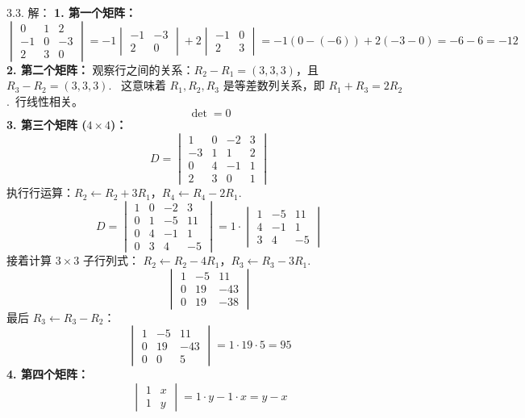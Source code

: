 \begin{exer}
3.3. 解：
\textbf{1. 第一个矩阵：}
$$ \begin{vmatrix} 0 & 1 & 2 \\ -1 & 0 & -3 \\ 2 & 3 & 0 \end{vmatrix} = -1 \begin{vmatrix} -1 & -3 \\ 2 & 0 \end{vmatrix} + 2 \begin{vmatrix} -1 & 0 \\ 2 & 3 \end{vmatrix} = -1(0 - (-6)) + 2(-3 - 0) = -6 - 6 = -12 $$
\textbf{2. 第二个矩阵：}
观察行之间的关系：$R_2 - R_1 = (3, 3, 3)$，且 $R_3 - R_2 = (3, 3, 3)$.~
这意味着 $R_1, R_2, R_3$ 是等差数列关系，即 $R_1 + R_3 = 2R_2$.~行线性相关。
$$ \det = 0 $$
\textbf{3. 第三个矩阵 ($4 \times 4$)：}
$$ D = \begin{vmatrix} 1 & 0 & -2 & 3 \\ -3 & 1 & 1 & 2 \\ 0 & 4 & -1 & 1 \\ 2 & 3 & 0 & 1 \end{vmatrix} $$
执行行运算：$R_2 \leftarrow R_2 + 3R_1$，$R_4 \leftarrow R_4 - 2R_1$.~
$$ D = \begin{vmatrix} 1 & 0 & -2 & 3 \\ 0 & 1 & -5 & 11 \\ 0 & 4 & -1 & 1 \\ 0 & 3 & 4 & -5 \end{vmatrix} = 1 \cdot \begin{vmatrix} 1 & -5 & 11 \\ 4 & -1 & 1 \\ 3 & 4 & -5 \end{vmatrix} $$
接着计算 $3 \times 3$ 子行列式：
$R_2 \leftarrow R_2 - 4R_1$，$R_3 \leftarrow R_3 - 3R_1$.~
$$ \begin{vmatrix} 1 & -5 & 11 \\ 0 & 19 & -43 \\ 0 & 19 & -38 \end{vmatrix} $$
最后 $R_3 \leftarrow R_3 - R_2$：
$$ \begin{vmatrix} 1 & -5 & 11 \\ 0 & 19 & -43 \\ 0 & 0 & 5 \end{vmatrix} = 1 \cdot 19 \cdot 5 = 95 $$
\textbf{4. 第四个矩阵：}
$$ \begin{vmatrix} 1 & x \\ 1 & y \end{vmatrix} = 1 \cdot y - 1 \cdot x = y - x $$


\end{exer}
